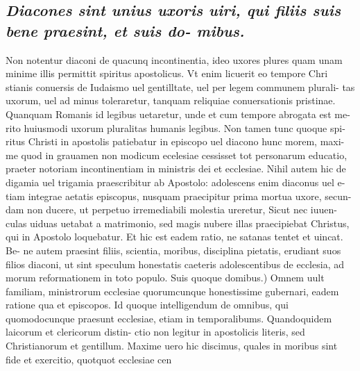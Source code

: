 \documentclass{article}
\begin{document}
\begin{pages}
\subsection*{\textit{Diacones sint unius uxoris uiri, qui filiis suis bene praesint, et suis do- mibus. }}\pstart Non notentur diaconi de quacunq incontinentia, ideo uxores plures quam unam minime illis permittit spiritus apostolicus. Vt enim licuerit eo tempore Chri stianis conuersis de Iudaismo uel gentilltate, uel per legem communem plurali- tas uxorum, uel ad minus toleraretur, tanquam reliquiae conuersationis pristinae. Quanquam Romanis id legibus uetaretur, unde et cum tempore abrogata est me- rito huiusmodi uxorum pluralitas humanis legibus. Non tamen tunc quoque spi- ritus Christi in apostolis patiebatur in episcopo uel diacono hunc morem, maxi- me quod in grauamen non modicum ecelesiae cessisset tot personarum educatio, praeter notoriam incontinentiam in ministris dei et ecclesiae. Nihil autem hic de digamia uel trigamia praescribitur ab Apostolo: adolescens enim diaconus uel e- tiam integrae aetatis episcopus, nusquam praecipitur prima mortua uxore, secun- dam non ducere, ut perpetuo irremediabili molestia ureretur, Sicut nec iuuen- culas uiduas uetabat a matrimonio, sed magis nubere illas praecipiebat Christus, qui in Apostolo loquebatur. Et hic est eadem ratio, ne satanas tentet et uincat. Be- ne autem praesint filiis, scientia, moribus, disciplina pietatis, erudiant suos filios diaconi, ut sint speculum honestatis caeteris adolescentibus de ecclesia, ad morum reformationem in toto populo. Suis quoque domibus.) Omnem uult familiam, ministrorum ecclesiae quorumcunque honestissime gubernari, eadem ratione qua et episcopos. Id quoque intelligendum de omnibus, qui quomodocunque praesunt ecclesiae, etiam in temporalibums. Quandoquidem laicorum et clericorum distin- ctio non legitur in apostolicis literis, sed Christianorum et gentillum. Maxime uero hic discimus, quales in moribus sint fide et exercitio, quotquot ecclesiae cen  \pend

\end{pages}
\end{document}
